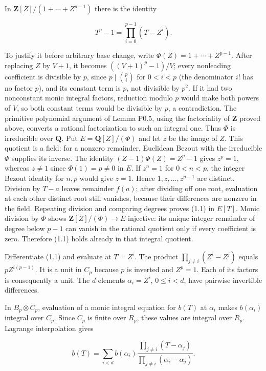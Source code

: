 \documentclass[11pt,a4paper,openany]{report}
\begin{document}
In \(\mathbf Z[Z]/(1+\cdots+Z^{p-1})\) there is the identity

\[
T^p-1=\prod_{i=0}^{p-1}(T-Z^i).                                      \tag{1.1}
\]

To justify it before arbitrary base change, write \(\Phi(Z)=1+\cdots+Z^{p-1}\). After replacing \(Z\) by \(V+1\), it becomes \(((V+1)^p-1)/V\); every nonleading coefficient is divisible by \(p\), since \(p\mid\binom pi\) for \(0<i<p\) (the denominator \(i!\) has no factor \(p\)), and its constant term is \(p\), not divisible by \(p^2\). If it had two nonconstant monic integral factors, reduction modulo \(p\) would make both powers of \(V\), so both constant terms would be divisible by \(p\), a contradiction. The primitive polynomial argument of Lemma P0.5, using the factoriality of \(\mathbf Z\) proved above, converts a rational factorization to such an integral one. Thus \(\Phi\) is irreducible over \(\mathbf Q\). Put \(E=\mathbf Q[Z]/(\Phi)\) and let \(z\) be the image of \(Z\). This quotient is a field: for a nonzero remainder, Euclidean Bezout with the irreducible \(\Phi\) supplies its inverse. The identity \((Z-1)\Phi(Z)=Z^p-1\) gives \(z^p=1\), whereas \(z\ne1\) since \(\Phi(1)=p\ne0\) in \(E\). If \(z^n=1\) for \(0<n<p\), the integer Bezout identity for \(n,p\) would give \(z=1\). Hence \(1,z,\ldots,z^{p-1}\) are distinct. Division by \(T-a\) leaves remainder \(f(a)\); after dividing off one root, evaluation at each other distinct root still vanishes, because their differences are nonzero in the field. Repeating division and comparing degrees proves (1.1) in \(E[T]\). Monic division by \(\Phi\) shows \(\mathbf Z[Z]/(\Phi)\to E\) injective: its unique integer remainder of degree below \(p-1\) can vanish in the rational quotient only if every coefficient is zero. Therefore (1.1) holds already in that integral quotient.

Differentiate (1.1) and evaluate at \(T=Z^i\). The product \(\prod_{j\ne i}(Z^i-Z^j)\) equals \(pZ^{i(p-1)}\). It is a unit in \(C_p\) because \(p\) is inverted and \(Z^p=1\). Each of its factors is consequently a unit. The \(d\) elements \(\alpha_i=Z^i\), \(0\le i<d\), have pairwise invertible differences.

In \(B_p\otimes C_p\), evaluation of a monic integral equation for \(b(T)\) at \(\alpha_i\) makes \(b(\alpha_i)\) integral over \(C_p\). Since \(C_p\) is finite over \(R_p\), these values are integral over \(R_p\). Lagrange interpolation gives

\[
b(T)=\sum_{i<d}b(\alpha_i)
\frac{\prod_{j\ne i}(T-\alpha_j)}
{\prod_{j\ne i}(\alpha_i-\alpha_j)}.                                  \tag{1.2}
\]
\end{document}
